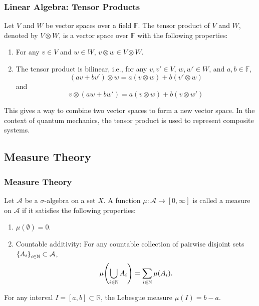 \documentclass[11pt, xcolor={dvipsnames, svgnames, table, x11names}, color]{beamer}
\newcommand{\R}{\mathbb{R}}
\newcommand{\F}{\mathbb{F}}
\begin{document}
\begin{frame}
    \frametitle{Linear Algebra: Tensor Products}
    \begin{definition}
        Let $V$ and $W$ be vector spaces over a field $\F$. The tensor product of $V$ and $W$, denoted by $V \otimes W$, is a vector space over $\F$ with the following properties:
        \begin{enumerate}
            \item For any $v \in V$ and $w \in W$, $v \otimes w \in V \otimes W$.
            \item The tensor product is bilinear, i.e., for any $v, v' \in V$, $w, w' \in W$, and $a, b \in \F$,
                  \begin{equation*}
                      (a v + b v') \otimes w = a(v \otimes w) + b(v' \otimes w)
                  \end{equation*}
                  and
                  \begin{equation*}
                      v \otimes (a w + b w') = a(v \otimes w) + b(v \otimes w')
                  \end{equation*}
        \end{enumerate}
    \end{definition}

    This gives a way to combine two vector spaces to form a new vector space. In the context of quantum mechanics, the tensor product is used to represent composite systems.
\end{frame}


\subsection{Measure Theory}
\begin{frame}
    \frametitle{Measure Theory}
    \begin{definition}
        Let $\mathcal{A}$ be a \alert{$\sigma$-algebra} on a set $X$. A function $\mu: \mathcal{A} \to [0, \infty]$ is called a measure on $\mathcal{A}$ if it satisfies the following properties:
        \begin{enumerate}
            \item $\mu(\emptyset) = 0$.
            \item Countable additivity: For any countable collection of pairwise disjoint sets $\qty{A_i}_{i \in \mathbb{N}} \subset \mathcal{A}$,
                  \begin{equation*}
                      \mu\qty(\bigcup_{i \in \mathbb{N}} A_i) = \sum_{i \in \mathbb{N}} \mu(A_i).
                  \end{equation*}
        \end{enumerate}
    \end{definition}

    \begin{example}
        For any interval $I = [a, b] \subset \R$, the Lebesgue measure $\mu(I) = b - a$.
    \end{example}
\end{frame}
\end{document}
